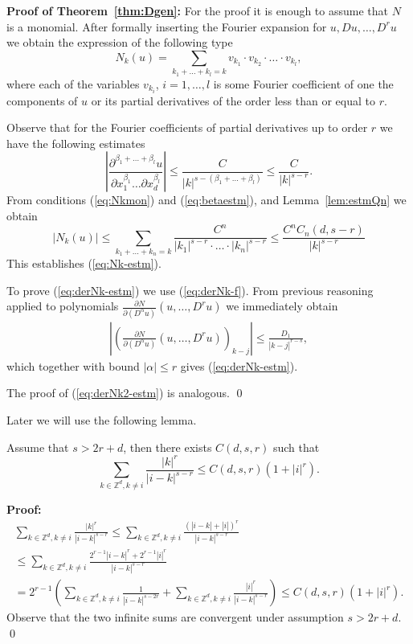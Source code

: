 \noindent \textbf{Proof of Theorem~\ref{thm:Dgen}:} For the proof it
is enough to assume that $N$ is a monomial. After formally
inserting the Fourier expansion  for $u,Du,\dots,D^r u$ we obtain
the expression of the following type
\begin{equation}
  N_k(u)=\sum_{k_1+\dots + k_l=k} v_{k_1} \cdot  v_{k_2} \cdot
  \dots \cdot v_{k_l}, \label{eq:Nkmon}
\end{equation}
where  each of the variables $v_{k_i}$, $i=1,\dots,l$ is some
Fourier coefficient of one the components of $u$ or its partial
derivatives of the order less than or equal to $r$.

Observe that for the Fourier coefficients of partial derivatives
up to order $r$ we have the following estimates
\begin{equation}
  \left| \frac{\partial^{\beta_1 + \dots + \beta_l} u}{\partial x_1^{\beta_1}\dots \partial x_d^{\beta_l}
  }\right| \leq \frac{C}{|k|^{s - (\beta_1 + \dots + \beta_l)}}
  \leq \frac{C}{|k|^{s - r}}.  \label{eq:betaestm}
\end{equation}
From conditions (\ref{eq:Nkmon}) and (\ref{eq:betaestm}), and
Lemma~\ref{lem:estmQn} we obtain
\begin{equation*}
 |N_k(u)| \leq \sum_{k_1+\dots + k_n=k} \frac{C^n}{|k_1|^{s-r} \cdot \dots \cdot |k_n|^{s-r}}
   \leq \frac{C^n C_n(d,s-r)}{|k|^{s-r}}
\end{equation*}
This establishes (\ref{eq:Nk-estm}).

To prove (\ref{eq:derNk-estm}) we use (\ref{eq:derNk-f}). From previous reasoning applied to polynomials $\frac{\partial N}{\partial (D^\alpha u)}(u,\dots,D^ru)$ we immediately
obtain
\begin{eqnarray*}
 \left|\left(\frac{\partial N}{\partial (D^\alpha u)}(u,\dots,D^ru)\right)_{k-j}\right| \leq \frac{D_1}{|k-j|^{r-s}},
\end{eqnarray*}
which together with bound $|\alpha| \leq r$ gives (\ref{eq:derNk-estm}).

The proof of (\ref{eq:derNk2-estm}) is analogous. \qed



Later we will use the following lemma.
\begin{lemma}
\label{lem:sumForDer}
Assume that $s > 2r + d$, then there exists $C(d,s,r)$ such that
\begin{equation*}
   \sum_{k \in \mathbb{Z}^d, k \neq i}\frac{|k|^r}{|i-k|^{s-r}} \leq  C(d,s,r)(1+|i|^r).
\end{equation*}
\end{lemma}
\textbf{Proof:}
\begin{multline*}
    \sum_{k \in \mathbb{Z}^d, k \neq i}\frac{|k|^r}{|i-k|^{s-r}} \leq \sum_{k \in \mathbb{Z}^d, k \neq i}\frac{(|i-k| + |i|)^r}{|i-k|^{s-r}} \\
\leq \sum_{k \in \mathbb{Z}^d, k \neq i}\frac{2^{r-1}|i-k|^r + 2^{r-1}|i|^r}{|i-k|^{s-r}}\\
= 2^{r-1} \left(\sum_{k \in \mathbb{Z}^d, k \neq i}\frac{1}{|i-k|^{s-2r}} + \sum_{k \in \mathbb{Z}^d, k \neq i}\frac{|i|^r}{|i-k|^{s-r}}\right) \leq
C(d,s,r)(1 + |i|^r).
\end{multline*}
Observe that the two infinite sums are convergent under assumption $s> 2r +d$.
\qed

